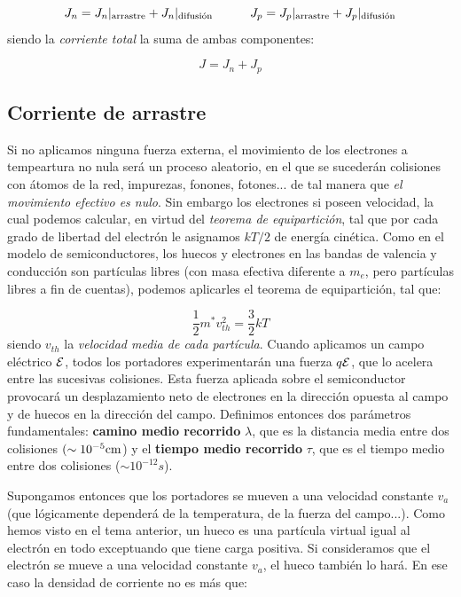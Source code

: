 \begin{equation}
	J_n =  {J_n}|_{\text{arrastre}} + {J_n}|_{\text{difusión}} \quad \quad \quad
	J_p =  {J_p}|_{\text{arrastre}} + {J_p}|_{\text{difusión}}
\end{equation}
siendo la \textit{corriente total} la suma de ambas componentes:

\begin{equation}
	J = J_n + J_p
\end{equation}

\subsection{Corriente de arrastre}

Si no aplicamos ninguna fuerza externa, el movimiento de los electrones a tempeartura no nula será un proceso aleatorio, en el que se sucederán colisiones con átomos de la red, impurezas, fonones, fotones... de tal manera que \textit{el movimiento efectivo es nulo}. Sin embargo los electrones si poseen velocidad, la cual podemos calcular, en virtud del \textit{teorema de equipartición}, tal que por cada grado de libertad del electrón le asignamos $kT/2$ de energía cinética. Como en el modelo de semiconductores, los huecos y electrones en las bandas de valencia y conducción son partículas libres (con masa efectiva diferente a $m_e$, pero partículas libres a fin de cuentas), podemos aplicarles el teorema de equipartición, tal que:

\begin{equation}
	\frac{1}{2} m^* v_{th}^2 = \frac{3}{2} kT
\end{equation}
siendo $v_{th}$ la \textit{velocidad media de cada partícula}. Cuando aplicamos un campo eléctrico $\mathcal{E}$, todos los portadores experimentarán una fuerza $q\mathcal{E}$, que lo acelera entre las sucesivas colisiones. Esta fuerza aplicada sobre el semiconductor provocará un desplazamiento neto de electrones en la dirección opuesta al campo y de huecos en la dirección del campo. Definimos entonces dos parámetros fundamentales: \textbf{camino medio recorrido} $\lambda$, que es la distancia media entre dos colisiones $(\sim 10^{-5} \text{cm}$) y el \textbf{tiempo medio recorrido} $\tau$, que es el tiempo medio entre dos colisiones ($\sim 10^{-12} s$).

Supongamos entonces que los portadores se mueven a una velocidad constante $v_a$ (que lógicamente dependerá de la temperatura, de la fuerza del campo...). Como hemos visto en el tema anterior, un hueco es una partícula virtual igual al electrón en todo exceptuando que tiene carga positiva. Si consideramos que el electrón se mueve a una velocidad constante $v_a$, el hueco también lo hará. En ese caso la densidad de corriente no es más que:

